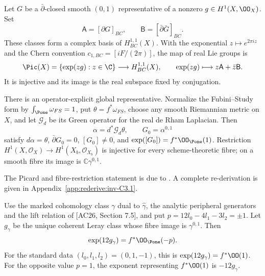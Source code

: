 \begin{proposition}\label{inv:C3.1}\label{wb:cor:picard-line-audit}
Let $G$ be a $\bar\partial$-closed smooth $(0,1)$ representative of
a nonzero $g\in H^1(X,\OO_X)$.  Set
\[
\mathsf A=[\partial G]_{BC},\qquad
\mathsf B=[\bar\partial\bar G]_{BC}.
\]
These classes form a complex basis of $H^{1,1}_{BC}(X)$.
With the exponential $z\mapsto e^{2\pi iz}$ and the Chern convention
$c_{1,BC}=[iF/(2\pi)]$, the map of real Lie groups is
\begin{equation}\label{inv:eq:C-Pic-map}
\Pic(X)=\{\exp(zg):z\in\C\}\longrightarrow H^{1,1}_{BC}(X),
\qquad \exp(zg)\longmapsto z\mathsf A+\bar z\mathsf B.
\end{equation}
It is injective and its image is the real subspace fixed by conjugation.

There is an operator-explicit global representative.  Normalize the
Fubini--Study form by $\int_{\Pone}\omega_{FS}=1$, put
$\theta=f^*\omega_{FS}$, choose any smooth Riemannian metric on $X$,
and let $\mathcal G_d$ be its Green operator for the real de Rham
Laplacian.  Then
\begin{equation}\label{inv:eq:C-G-Green}
\alpha=d^*\mathcal G_d\theta,\qquad G_0=\alpha^{0,1}
\end{equation}
satisfy $d\alpha=\theta$, $\bar\partial G_0=0$,
$[G_0]\ne0$, and $\exp([G_0])=f^*\OO_{\Pone}(1)$.
Restriction $H^1(X,\mathcal O_X)\to H^1(X_b,\mathcal O_{X_b})$ is injective for every scheme-theoretic fibre; on a smooth fibre its image is $\mathbb C\gamma^{0,1}$.
\end{proposition}


The Picard and fibre-restriction statement is due to \citet[Theorem~10.5]{AC2026}. A complete re-derivation is given in Appendix~\ref{app:rederive:inv-C3.1}.


\begin{proposition}\label{inv:C3.2}\label{wb:lem:bcpr-degree-one-input}
Use the marked cohomology class $\gamma$ dual to
$\hat\gamma$, the analytic peripheral generators and the lift relation of
[AC26, Section 7.5], and put
$p=12l_0-4l_1-3l_2=\pm1$.  Let $g_\gamma$ be the unique coherent
Leray class whose fibre image is $\gamma^{0,1}$.  Then
\begin{equation}\label{inv:eq:C-factor12}
\exp(12g_\gamma)=f^*\OO_{\Pone}(-p).
\end{equation}
For the standard data $(l_0,l_1,l_2)=(0,1,-1)$, this is
$\exp(12g_\gamma)=f^*\OO(1)$.  For the opposite value $p=1$,
the exponent representing $f^*\OO(1)$ is $-12g_\gamma$.
\end{proposition}

